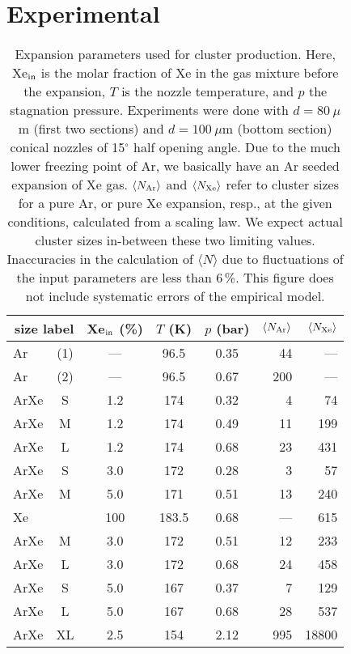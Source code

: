 \section{Experimental}
%
\begin{table*}
\caption{
Expansion parameters used for cluster production. 
Here, Xe$_{\rm in}$ is the molar fraction of Xe in the gas mixture before the expansion, $T$ is the nozzle temperature, and $p$ the stagnation pressure. 
Experiments were done with $d = 80~\mu$m (first two sections) and $d = 100~\mu$m (bottom section) conical nozzles of 15$^\circ$ half opening angle. 
Due to the much lower freezing point of Ar, we basically have an Ar seeded expansion of Xe gas. 
$\langle N_{\rm Ar} \rangle$ and $\langle N_{\rm Xe} \rangle$ refer to cluster sizes for a pure Ar, or pure Xe expansion, resp., at the given conditions, calculated from a scaling law.\protect\cite{hagena1981}
We expect actual cluster sizes in-between these two limiting values. 
Inaccuracies in the calculation of $\langle N\rangle$ due to fluctuations of the input parameters are less than 6\,\%. This figure does not include systematic errors of the empirical model.
}
\label{tab:cluster}

\begin{tabular}{l c c c c r r}
%
\toprule
  \multicolumn{2}{r}{size label}  &  Xe$_{\rm in}$ (\%)  &  $T$ (K)  &  $p$ (bar) & $\langle N_{\rm Ar} \rangle$ & $\langle N_{\rm Xe} \rangle$ \\
%
\midrule
Ar & (1) & --- &  96.5  & 0.35  & 44  &  --- \\
Ar & (2) & --- &  96.5  & 0.67  & 200  &  --- \\
ArXe & S & 1.2 &  174   & 0.32  & 4  &   74 \\
ArXe & M & 1.2 &  174   & 0.49  & 11  &  199 \\
ArXe & L & 1.2 &  174   & 0.68  & 23  &  431 \\
ArXe & S & 3.0 &  172   & 0.28  & 3  &   57 \\
ArXe & M & 5.0 &  171   & 0.51  & 13  &  240 \\
Xe &  & 100 & 183.5  & 0.68  & ---  &  615 \\     
\midrule
ArXe & M & 3.0 &  172   & 0.51  & 12  &  233 \\
ArXe & L & 3.0 &  172   & 0.68  & 24  &  458 \\
ArXe & S  & 5.0 &  167  & 0.37  & 7  &  129 \\
ArXe & L  & 5.0 &  167  & 0.68  & 28  &  537 \\
\midrule
ArXe & XL & 2.5 &  154  & 2.12  & 995 & 18800\\
%
\bottomrule
\end{tabular}
\end{table*}
